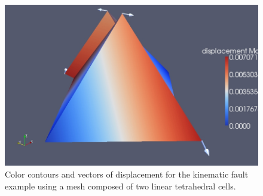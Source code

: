 \begin{figure}
  \includegraphics[scale=0.33]{examples/figs/twotet4-dislocation}
  \caption{Color contours and vectors of displacement for the kinematic fault
    example using a mesh composed of two linear tetrahedral cells.}
  \label{fig:twotet4-disloc}
\end{figure}


